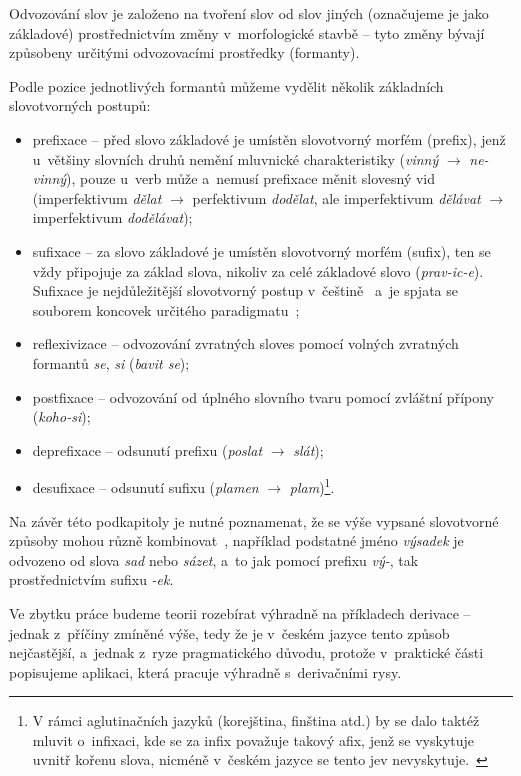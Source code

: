 Odvozování slov je založeno na tvoření slov od slov jiných (označujeme
je jako základové) prostřednictvím změny v~morfologické stavbě -- tyto
změny bývají způsobeny určitými odvozovacími prostředky (formanty).
\parencite[93]{dokulil00}

Podle pozice jednotlivých formantů můžeme vydělit několik základních
slovotvorných postupů:

\begin{itemize}
\tightlist
\item
  prefixace -- před slovo základové je umístěn slovotvorný morfém
  (prefix), jenž u~většiny slovních druhů nemění mluvnické
  charakteristiky (\emph{vinný} $\rightarrow$ \emph{ne-vinný}), pouze
  u~verb může a~nemusí prefixace měnit slovesný vid (imperfektivum
  \emph{dělat} $\rightarrow$ perfektivum \emph{dodělat}, ale
  imperfektivum \emph{dělávat} $\rightarrow$ imperfektivum
  \emph{dodělávat});
\item
  sufixace -- za slovo základové je umístěn slovotvorný morfém (sufix),
  ten se vždy připojuje za základ slova, nikoliv za celé základové slovo
  (\emph{prav-ic-e}). Sufixace je nejdůležitější slovotvorný postup
v~češtině~\parencite[23]{dokulil62} a~je spjata se souborem koncovek
  určitého paradigmatu~\parencite[93]{dokulil00};
\item
  reflexivizace -- odvozování zvratných sloves pomocí volných zvratných
  formantů \emph{se}, \emph{si} (\emph{bavit se});
\item
  postfixace -- odvozování od úplného slovního tvaru pomocí zvláštní
  přípony (\emph{koho-si});
\item
  deprefixace -- odsunutí prefixu (\emph{poslat} $\rightarrow$
  \emph{slát});
\item
  desufixace -- odsunutí sufixu (\emph{plamen} $\rightarrow$
  \emph{plam})\footnote{V rámci aglutinačních jazyků (korejština, finština atd.) by se dalo taktéž mluvit o~infixaci, kde se za infix považuje takový afix, jenž se vyskytuje uvnitř kořenu slova, nicméně v~českém jazyce se tento jev nevyskytuje.~\parencite{enc-morfem17}}.
 ~\parencite[93--94]{dokulil00}
\end{itemize}

Na závěr této podkapitoly je nutné poznamenat, že se výše vypsané
slovotvorné způsoby mohou různě kombinovat~\parencite[93]{dokulil00},
například podstatné jméno \emph{výsadek} je odvozeno od slova \emph{sad}
nebo \emph{sázet}, a~to jak pomocí prefixu \emph{vý-}, tak
prostřednictvím sufixu \emph{-ek}.

Ve zbytku práce budeme teorii rozebírat výhradně na příkladech derivace
-- jednak z~příčiny zmíněné výše, tedy že je v~českém jazyce tento
způsob nejčastější, a~jednak z~ryze pragmatického důvodu, protože
v~praktické části popisujeme aplikaci, která pracuje výhradně
s~derivačními rysy.

